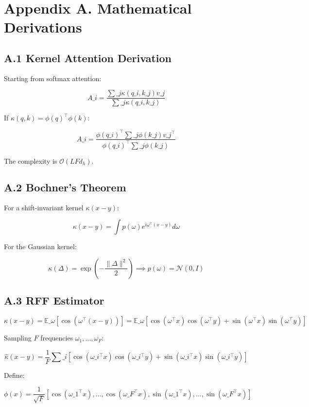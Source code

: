 \section{Appendix A. Mathematical Derivations}

\subsection{A.1 Kernel Attention Derivation}

Starting from softmax attention:

\[
A\_i = \frac{\sum\_j \kappa(q\_i, k\_j) v\_j}{\sum\_j \kappa(q\_i, k\_j)}
\tag{A.1}
\]

If $\kappa(q, k) = \phi(q)^\top \phi(k)$:

\[
A\_i = \frac{\phi(q\_i)^\top \sum\_j \phi(k\_j) v\_j^\top}{\phi(q\_i)^\top \sum\_j \phi(k\_j)}
\tag{A.2}
\]

The complexity is $\mathcal{O}(L F d_h)$.

\subsection{A.2 Bochner's Theorem}

For a shift-invariant kernel $\kappa(x - y)$:

\[
\kappa(x - y) = \int p(\omega) e^{i \omega^\top (x - y)} d\omega
\tag{A.3}
\]

For the Gaussian kernel:

\[
\kappa(\Delta) = \exp\!\left(-\frac{\|\Delta\|^2}{2}\right) \implies p(\omega) = \mathcal{N}(0, I)
\tag{A.4}
\]

\subsection{A.3 RFF Estimator}

\[
\kappa(x - y) = \mathbb{E}\_\omega[\cos(\omega^\top (x - y))] = \mathbb{E}\_\omega[\cos(\omega^\top x) \cos(\omega^\top y) + \sin(\omega^\top x) \sin(\omega^\top y)]
\tag{A.5}
\]

Sampling $F$ frequencies $\omega_1, \dots, \omega_F$:

\[
\hat{\kappa}(x - y) = \frac{1}{F} \sum\_i [\cos(\omega\_i^\top x) \cos(\omega\_i^\top y) + \sin(\omega\_i^\top x) \sin(\omega\_i^\top y)]
\tag{A.6}
\]

Define:

\[
\phi(x) = \frac{1}{\sqrt{F}} [\cos(\omega\_1^\top x), \dots, \cos(\omega\_F^\top x), \sin(\omega\_1^\top x), \dots, \sin(\omega\_F^\top x)]
\tag{A.7}
\]

